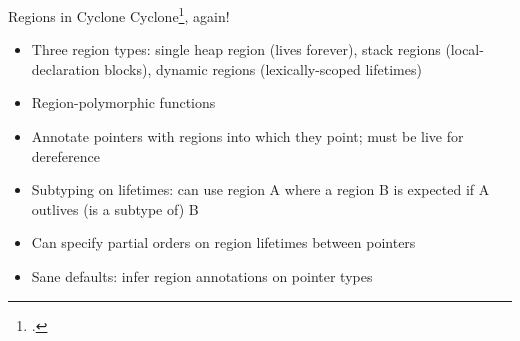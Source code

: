 \documentclass[aspectratio=169]{beamer}
\begin{document}
\begin{frame}{Regions in Cyclone}
    Cyclone\footcite{grossman_region-based_2002}, again!
    \begin{itemize}[<+->]
        \item Three region types: single \alert{heap} region (lives forever), \alert{stack} regions (local-declaration blocks), \alert{dynamic} regions (lexically-scoped lifetimes)
        \item Region-polymorphic functions
        \item Annotate pointers with regions into which they point; must be live for dereference
        \item Subtyping on lifetimes: can use region A where a region B is expected if A \alert{outlives} (is a subtype of) B
        \item Can specify partial orders on region lifetimes between pointers
        \item Sane defaults: infer region annotations on pointer types  %
    \end{itemize}
    \vspace{0.1in}
\end{frame}
\end{document}
